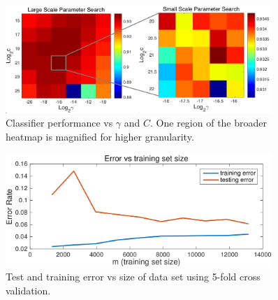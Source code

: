 \documentclass[12pt]{article}
\begin{document}
\begin{figure}
\begin{center}
\includegraphics[width=0.9\textwidth]{figures/paramSearch}
\end{center}
\caption{Classifier performance vs $\gamma$ and $C$. One region of the broader heatmap is magnified for higher granularity.}
\label{paramSearch}
\end{figure}

\begin{figure}
\begin{center}
\includegraphics[width=0.9\textwidth]{figures/error}
\end{center}
\caption{Test and training error vs size of data set using 5-fold cross validation.}
\label{error}
\end{figure}


\end{document}
